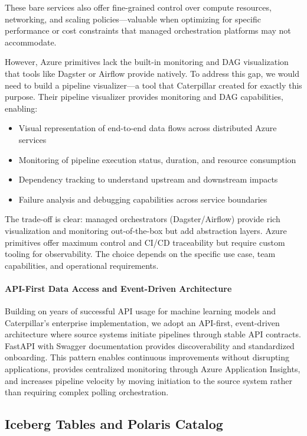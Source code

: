 \documentclass[12pt, a4paper]{article}
\begin{document}
These bare services also offer fine-grained control over compute resources, networking, and scaling policies—valuable when optimizing for specific performance or cost constraints that managed orchestration platforms may not accommodate.

However, Azure primitives lack the built-in monitoring and DAG visualization that tools like Dagster or Airflow provide natively. To address this gap, we would need to build a pipeline visualizer—a tool that Caterpillar created for exactly this purpose. Their pipeline visualizer provides monitoring and DAG capabilities, enabling:

\begin{itemize}[leftmargin=*, nosep]
    \item Visual representation of end-to-end data flows across distributed Azure services
    \item Monitoring of pipeline execution status, duration, and resource consumption
    \item Dependency tracking to understand upstream and downstream impacts
    \item Failure analysis and debugging capabilities across service boundaries
\end{itemize}

The trade-off is clear: managed orchestrators (Dagster/Airflow) provide rich visualization and monitoring out-of-the-box but add abstraction layers. Azure primitives offer maximum control and CI/CD traceability but require custom tooling for observability. The choice depends on the specific use case, team capabilities, and operational requirements.

\paragraph{API-First Data Access and Event-Driven Architecture}
Building on years of successful API usage for machine learning models and Caterpillar's enterprise implementation, we adopt an API-first, event-driven architecture where source systems initiate pipelines through stable API contracts. FastAPI with Swagger documentation provides discoverability and standardized onboarding. This pattern enables continuous improvements without disrupting applications, provides centralized monitoring through Azure Application Insights, and increases pipeline velocity by moving initiation to the source system rather than requiring complex polling orchestration.

\subsection{Iceberg Tables and Polaris Catalog}
\end{document}

